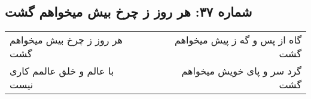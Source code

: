 \begin{center}
\section*{شماره ۳۷: هر روز ز چرخ بیش میخواهم گشت}
\label{sec:037}
\begin{longtable}{l p{0.5cm} r}
هر روز ز چرخ بیش میخواهم گشت
&&
گاه از پس و گه ز پیش میخواهم گشت
\\
با عالم و خلق عالمم کاری نیست
&&
گرد سر و پای خویش میخواهم گشت
\\
\end{longtable}
\end{center}
